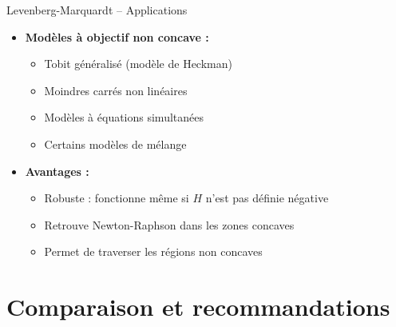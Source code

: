 \documentclass[11pt,aspectratio=169]{beamer}
\begin{document}
\begin{frame}{Levenberg-Marquardt -- Applications}

\begin{itemize}

\item \textbf{Modèles à objectif non concave :}
  \begin{itemize}
    \item Tobit généralisé (modèle de Heckman)\newline
    \item Moindres carrés non linéaires\newline
    \item Modèles à équations simultanées\newline
    \item Certains modèles de mélange\newline
  \end{itemize}

\item \textbf{Avantages :}
  \begin{itemize}
    \item Robuste : fonctionne même si $H$ n'est pas définie négative\newline
    \item Retrouve Newton-Raphson dans les zones concaves\newline
    \item Permet de traverser les régions non concaves
  \end{itemize}

\end{itemize}

\end{frame}

\section{Comparaison et recommandations}
\end{document}

